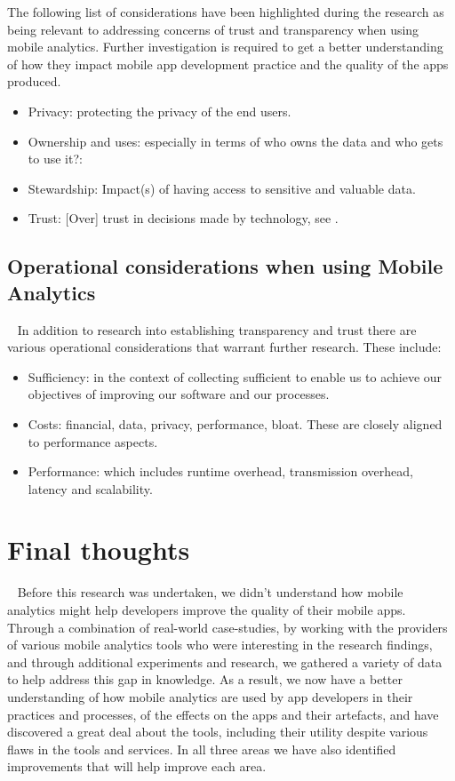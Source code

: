 The following list of considerations have been highlighted during the research as being relevant to addressing concerns of trust and transparency when using mobile analytics. Further investigation is required to get a better understanding of how they impact mobile app development practice and the quality of the apps produced.

\begin{itemize}
    \item Privacy: protecting the privacy of the end users. 
    \item Ownership and uses: especially in terms of who owns the data and who gets to use it?:
    \item Stewardship: Impact(s) of having access to sensitive and valuable data.  
    \item Trust: [Over] trust in decisions made by technology, see .
\end{itemize}


\subsection{Operational considerations when using Mobile Analytics}~\label{fw-operational-considerations-topic}
In addition to research into establishing transparency and trust there are various operational considerations that warrant further research. These include: 

\begin{itemize}
    \item Sufficiency: in the context of collecting sufficient to enable us to achieve our objectives of improving our software and our processes.    
    \item Costs: financial, data, privacy, performance, bloat. These are closely aligned to performance aspects.
    \item Performance: which includes runtime overhead, transmission overhead, latency and scalability.
\end{itemize}


\section{Final thoughts}~\label{final-thoughts-to-the-thesis}
Before this research was undertaken, we didn't understand how mobile analytics might help developers improve the quality of their mobile apps. Through a combination of real-world case-studies, by working with the providers of various mobile analytics tools who were interesting in the research findings, and through additional experiments and research, we gathered a variety of data to help address this gap in knowledge. As a result, we now have a better understanding of how mobile analytics are used by app developers in their practices and processes, of the effects on the apps and their artefacts, and have discovered a great deal about the tools, including their utility despite various flaws in the tools and services. In all three areas we have also identified improvements that will help improve each area.


